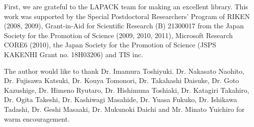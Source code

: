 \documentclass[12pt]{article}
\begin{document}
First, we are grateful to the LAPACK team for making an excellent library.
This work was supported by the Special Postdoctoral Researchers' Program of RIKEN (2008, 2009), Grant-in-Aid for Scientific Research (B) 21300017 from the Japan Society for the Promotion of Science (2009, 2010, 2011), Microsoft Research CORE6 (2010), the Japan Society for the Promotion of Science (JSPS KAKENHI Grant no. 18H03206) and TIS inc.

The author would like to thank Dr. Imamura Toshiyuki. Dr. Nakasato Naohito, Dr. Fujisawa Katsuki, Dr. Kouya Tomonori, Dr. Takahashi Daisuke, Dr. Goto Kazushige, Dr. Himeno Ryutaro, Dr. Hishimuna Toshiaki, Dr. Katagiri Takahiro, Dr. Ogita Takeshi, Dr. Kashiwagi Masahide, Dr. Yuasa Fukuko, Dr. Ishikawa Tadashi, Dr. Geshi Masaaki, Dr. Mukunoki Daichi and Mr. Minato Yuichiro for warm encouragement.


\end{document}
